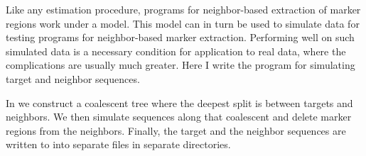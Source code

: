 Like any estimation procedure, programs for neighbor-based extraction
of marker regions work under a model. This model can in turn be used
to simulate data for testing programs for neighbor-based marker
extraction. Performing well on such simulated data is a necessary
condition for application to real data, where the complications are
usually much greater. Here I write the program  for
simulating target and neighbor sequences.

In  we construct a coalescent tree where the deepest split is
between targets and neighbors. We then simulate sequences along that
coalescent and delete marker regions from the neighbors. Finally, the
target and the neighbor sequences are written to into separate files
in separate directories.
